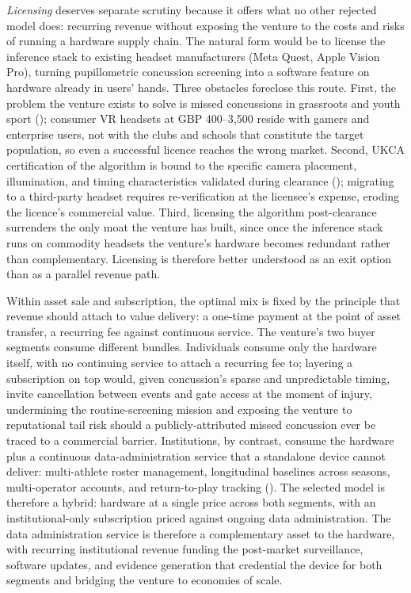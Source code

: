 \textit{Licensing} deserves separate scrutiny because it offers what no other rejected model does: recurring revenue without exposing the venture to the costs and risks of running a hardware supply chain. The natural form would be to license the inference stack to existing headset manufacturers (Meta Quest, Apple Vision Pro), turning pupillometric concussion screening into a software feature on hardware already in users' hands. Three obstacles foreclose this route. First, the problem the venture exists to solve is missed concussions in grassroots and youth sport (); consumer VR headsets at GBP 400--3{,}500 reside with gamers and enterprise users, not with the clubs and schools that constitute the target population, so even a successful licence reaches the wrong market. Second, UKCA certification of the algorithm is bound to the specific camera placement, illumination, and timing characteristics validated during clearance (); migrating to a third-party headset requires re-verification at the licensee's expense, eroding the licence's commercial value. Third, licensing the algorithm post-clearance surrenders the only moat the venture has built, since once the inference stack runs on commodity headsets the venture's hardware becomes redundant rather than complementary. Licensing is therefore better understood as an exit option than as a parallel revenue path.

Within asset sale and subscription, the optimal mix is fixed by the principle that revenue should attach to value delivery: a one-time payment at the point of asset transfer, a recurring fee against continuous service. The venture's two buyer segments consume different bundles. Individuals consume only the hardware itself, with no continuing service to attach a recurring fee to; layering a subscription on top would, given concussion's sparse and unpredictable timing, invite cancellation between events and gate access at the moment of injury, undermining the routine-screening mission and exposing the venture to reputational tail risk should a publicly-attributed missed concussion ever be traced to a commercial barrier. Institutions, by contrast, consume the hardware plus a continuous data-administration service that a standalone device cannot deliver: multi-athlete roster management, longitudinal baselines across seasons, multi-operator accounts, and return-to-play tracking (). The selected model is therefore a hybrid: hardware at a single price across both segments, with an institutional-only subscription priced against ongoing data administration. The data administration service is therefore a complementary asset \citep{teece1986complementary} to the hardware, with recurring institutional revenue funding the post-market surveillance, software updates, and evidence generation that credential the device for both segments and bridging the venture to economies of scale.


